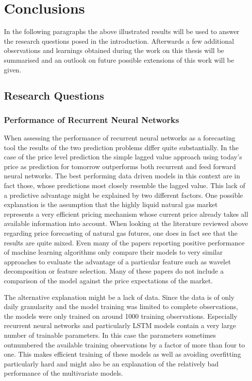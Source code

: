 \chapter{Conclusions}\label{Sec:Conc}
In the following paragraphs the above illustrated results will be used to answer the research questions posed in the introduction. Afterwards a few additional observations and learnings obtained during the work on this thesis will be summarised and an outlook on future possible extensions of this work will be given.
\section{Research Questions}
\subsection{Performance of Recurrent Neural Networks}
When assessing the performance of recurrent neural networks as a forecasting tool the results of the two prediction problems differ quite substantially. In the case of the price level prediction the simple lagged value approach using today's price as prediction for tomorrow outperforms both recurrent and feed forward neural networks. The best performing data driven models in this context are in fact those, whose predictions most closely resemble the lagged value. This lack of a predictive advantage might be explained by two different factors. One possible explanation is the assumption that the highly liquid natural gas market represents a very efficient pricing mechanism whose current price already takes all available information into account. When looking at the literature reviewed above regarding price forecasting of natural gas futures, one does in fact see that the results are quite mixed. Even many of the papers reporting positive performance of machine learning algorithms only compare their models to very similar approaches to evaluate the advantage of a particular feature such as wavelet decomposition or feature selection. Many of these papers do not include a comparison of the model against the price expectations of the market.

The alternative explanation might be a lack of data. Since the data is of only daily granularity and the model training was limited to complete observations, the models were only trained on around 1000 training observations. Especially recurrent neural networks and particularly LSTM models contain a very large number of trainable parameters. In this case the parameters sometimes outnumbered the available training observations by a factor of more than four to one. This makes efficient training of these models as well as avoiding overfitting particularly hard and might also be an explanation of the relatively bad performance of the multivariate models. 

